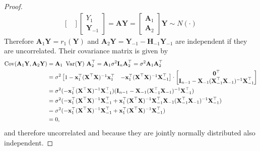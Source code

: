 \begin{proof}
\begin{align*}
\begin{bmatrix}
        \end{bmatrix}
        \begin{bmatrix}
            Y_1 \\
            \textbf{Y}_{-1}
        \end{bmatrix}
        =
        \textbf{AY} =
                \begin{bmatrix}
            \textbf{A}_1 \\
            \textbf{A}_2
        \end{bmatrix}
        \textbf{Y}
        \sim N(\cdot)
              \
    \end{align*}
    Therefore $\textbf{A}_1 \textbf{Y} = r_1(\textbf{Y})$ and $\textbf{A}_2 \textbf{Y} = \textbf{Y}_{-1} - \textbf{H}_{-1} \textbf{Y}_{-1}$ are independent if they are uncorrelated. Their covariance matrix is given by 
    \begin{align*}
        \operatorname{\text{Cov}}(\textbf{A}_1 \textbf{Y}, \mathbf{A}_2 \textbf{Y}) &= \textbf{A}_1\  \operatorname{\text{Var}}(\textbf{Y}) \ \textbf{A}_2^\top = \textbf{A}_1 \sigma^2 \textbf{I}_n \textbf{A}_2^\top = \sigma^2 \textbf{A}_1 \mathbf{A}_2^\top \\
        &= \sigma^2 
        \begin{bmatrix}
            1 - \textbf{x}_1^\top (\textbf{X}^\top \textbf{X})^{-1} \textbf{x}_1^\top & - \textbf{x}_1^\top (\textbf{X}^\top \textbf{X})^{-1} \textbf{X}_{-1}^\top
        \end{bmatrix}
        \cdot
        \begin{bmatrix}
            \textbf{0}^\top \\
            \textbf{I}_{n-1} - \textbf{X}_{-1} (\textbf{X}_{-1}^\top \textbf{X}_{-1})^{-1} \textbf{X}_{-1}^\top
        \end{bmatrix} \\
        &= \sigma^2 (- \textbf{x}_1^\top (\textbf{X}^\top \textbf{X})^{-1} \textbf{X}_{-1}^\top) (\textbf{I}_{n-1} - \textbf{X}_{-1} (\textbf{X}_{-1}^\top \textbf{X}_{-1})^{-1} \textbf{X}_{-1}^\top) \\
        &= \sigma^2 (- \textbf{x}_1^\top (\textbf{X}^\top \textbf{X})^{-1} \textbf{X}_{-1}^\top + \textbf{x}_1^\top (\textbf{X}^\top \textbf{X})^{-1} \textbf{X}_{-1}^\top \textbf{X}_{-1} (\textbf{X}_{-1}^\top \textbf{X}_{-1})^{-1} \textbf{X}_{-1}^\top) \\
        &= \sigma^2 (- \textbf{x}_1^\top (\textbf{X}^\top \textbf{X})^{-1} \textbf{X}_{-1}^\top + \textbf{x}_1^\top (\textbf{X}^\top \textbf{X})^{-1} \textbf{X}_{-1}^\top) \\
        &= 0,
    \end{align*}
    and therefore uncorrelated and because they are jointly normally distributed also independent.
\end{proof}

